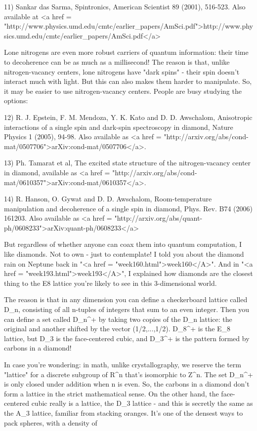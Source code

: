 11) Sankar das Sarma, Spintronics, American Scientist
89 (2001), 516-523.  Also available at 
<a href = "http://www.physics.umd.edu/cmtc/earlier_papers/AmSci.pdf">http://www.physics.umd.edu/cmtc/earlier_papers/AmSci.pdf</a>

Lone nitrogens are even more robust carriers of quantum 
information: their time to decoherence can be as much as a 
millisecond!  The reason is that, unlike nitrogen-vacancy 
centers, lone nitrogens have "dark spins" - their spin 
doesn't interact much with light.  But this can also makes 
them harder to manipulate.  So, it may be easier to use 
nitrogen-vacancy centers.  People are busy studying the options:

12) R. J. Epstein, F. M. Mendoza, Y. K. Kato and D. D. 
Awschalom, Anisotropic interactions of a single spin and 
dark-spin spectroscopy in diamond, Nature Physics 1 (2005), 
94-98.  Also available as <a href = "http://arxiv.org/abs/cond-mat/0507706">arXiv:cond-mat/0507706</a>.

13) Ph. Tamarat et al, The excited state structure of the 
nitrogen-vacancy center in diamond, available as 
<a href = "http://arxiv.org/abs/cond-mat/0610357">arXiv:cond-mat/0610357</a>.

14) R. Hanson, O. Gywat and D. D. Awschalom, Room-temperature 
manipulation and decoherence of a single spin in diamond,
Phys. Rev. B74 (2006) 161203.  Also available as 
<a href = "http://arxiv.org/abs/quant-ph/0608233">arXiv:quant-ph/0608233</a>

But regardless of whether anyone can coax them into quantum
computation, I like diamonds.  Not to own - just to contemplate!  I
told you about the diamond rain on Neptune back in "<a href =
"week160.html">week160</A>".  And in "<a href =
"week193.html">week193</A>", I explained how diamonds are the
closest thing to the E8 lattice you're likely to see in this
3-dimensional world.

The reason is that in any dimension you can define a checkerboard
lattice called D_{n}, consisting of all n-tuples of integers
that sum to an even integer.  Then you can define a set called
D_{n}^{+} by taking two copies of the D_{n}
lattice: the original and another shifted by the vector (1/2,...,1/2).
D_{8}^{+} is the E_{8} lattice, but
D_{3} is the face-centered cubic, and
D_{3}^{+} is the pattern formed by carbons in a
diamond!

In case you're wondering: in math, unlike crystallography,
we reserve the term "lattice" for 
a discrete subgroup of R^{n} that's isomorphic to
Z^{n}.  The set D_{n}^{+} is only closed under 
addition when n is even.  So, the carbons in a diamond don't form a 
lattice in the strict
mathematical sense.  On the other hand, the face-centered cubic 
really is a lattice, the D_{3} lattice - and this is
secretly the same as the A_{3} lattice, familiar from stacking
oranges.  It's one of the densest ways to pack spheres, with a density
of

